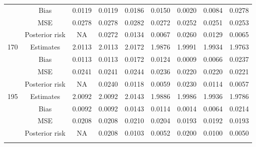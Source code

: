 \documentclass[a4paper,12pt]{report}
\begin{document}
\begin{minipage}{\linewidth}
{\begin{tabular}{|c|c|c|c|c|c|c|c|c|}
			&Bias           &0.0119 &0.0119 &0.0186 &0.0150 &0.0020 &0.0084 &0.0278 \\
			&MSE            &0.0278 &0.0278 &0.0282 &0.0272 &0.0252 &0.0251 &0.0253 \\
			&Posterior risk    &NA &0.0272 &0.0134 &0.0067 &0.0260 &0.0129 &0.0065 \\ \hline
			170&	Estimates      &2.0113 &2.0113 &2.0172 &1.9876 &1.9991 &1.9934 &1.9763 \\
			&Bias           &0.0113 &0.0113 &0.0172 &0.0124 &0.0009 &0.0066 &0.0237\\
			&MSE            &0.0241 &0.0241 &0.0244 &0.0236 &0.0220 &0.0220 &0.0221 \\
			&Posterior risk    &NA &0.0240 &0.0118 &0.0059 &0.0230 &0.0114 &0.0057 \\ \hline
			195&	Estimates      &2.0092 &2.0092 &2.0143 &1.9886 &1.9986 &1.9936 &1.9786 \\
			&Bias           &0.0092 &0.0092 &0.0143 &0.0114 &0.0014 &0.0064 &0.0214 \\
			&MSE            &0.0208 &0.0208 &0.0210 &0.0204 &0.0193 &0.0192 &0.0193 \\
			&Posterior risk    &NA &0.0208 &0.0103 &0.0052 &0.0200 &0.0100 &0.0050 \\ \hline
			\ECC
		\end{tabular}
	}
\end{minipage}
\newpage

{\\ \vspace{1cm}}
\end{document}
